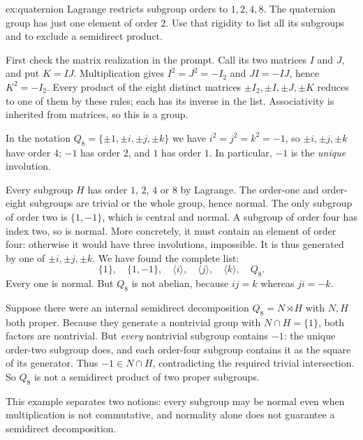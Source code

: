 \begin{solution}{ex:quaternion}
\idea Lagrange restricts subgroup orders to $1,2,4,8$. The quaternion group has just one element of order $2$. Use that rigidity to list all its subgroups and to exclude a semidirect product.

\writeup First check the matrix realization in the prompt. Call its two matrices $I$ and $J$, and put $K=IJ$. Multiplication gives $I^2=J^2=-I_2$ and $JI=-IJ$, hence $K^2=-I_2$. Every product of the eight distinct matrices $\pm I_2,\pm I,\pm J,\pm K$ reduces to one of them by these rules; each has its inverse in the list. Associativity is inherited from matrices, so this is a group.

In the notation $Q_8=\{\pm1,\pm i,\pm j,\pm k\}$ we have $i^2=j^2=k^2=-1$, so $\pm i,\pm j,\pm k$ have order $4$; $-1$ has order $2$, and $1$ has order $1$. In particular, $-1$ is the \emph{unique} involution.

Every subgroup $H$ has order $1$, $2$, $4$ or $8$ by Lagrange. The order-one and order-eight subgroups are trivial or the whole group, hence normal. The only subgroup of order two is $\{1,-1\}$, which is central and normal. A subgroup of order four has index two, so is normal. More concretely, it must contain an element of order four: otherwise it would have three involutions, impossible. It is thus generated by one of $\pm i,\pm j,\pm k$. We have found the complete list:
\[
\{1\},\quad\{1,-1\},\quad\langle i\rangle,\quad
\langle j\rangle,\quad\langle k\rangle,\quad Q_8.
\]
Every one is normal. But $Q_8$ is not abelian, because $ij=k$ whereas $ji=-k$.

Suppose there were an internal semidirect decomposition $Q_8=N\rtimes H$ with $N,H$ both proper. Because they generate a nontrivial group with $N\cap H=\{1\}$, both factors are nontrivial. But \emph{every} nontrivial subgroup contains $-1$: the unique order-two subgroup does, and each order-four subgroup contains it as the square of its generator. Thus $-1\in N\cap H$, contradicting the required trivial intersection. So $Q_8$ is not a semidirect product of two proper subgroups.

This example separates two notions: every subgroup may be normal even when multiplication is not commutative, and normality alone does not guarantee a semidirect decomposition.
\end{solution}

